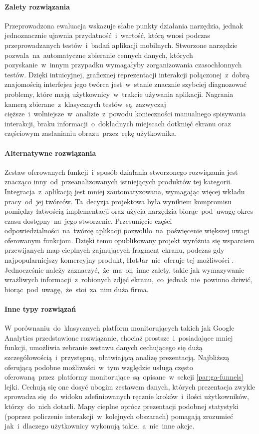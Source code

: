 \paragraph{Zalety rozwiązania}
Przeprowadzona ewaluacja wskazuje słabe punkty działania narzędzia, jednak jednoznacznie ujawnia przydatność~i~wartość, którą wnosi podczas przeprowadzanych testów~i~badań aplikacji mobilnych. Stworzone narzędzie pozwala~na~automatyczne zbieranie cennych danych, których pozyskanie~w~innym przypadku wymagałyby zorganizowania czasochłonnych testów. Dzięki intuicyjnej, graficznej reprezentacji interakcji połączonej~z~dobrą znajomością interfejsu jego twórca jest~w~stanie znacznie szybciej diagnozować problemy, które mają użytkownicy~w~trakcie używania aplikacji. Nagrania kamerą zbierane~z~klasycznych testów~są~zazwyczaj cięższe~i~wolniejsze~w~analizie~z~powodu konieczności manualnego spisywania interakcji, braku informacji~o~dokładnych miejscach dotknięć ekranu oraz częściowym zasłanianiu obrazu~przez~rękę użytkownika. 

\paragraph{Alternatywne rozwiązania}
Zestaw oferowanych funkcji~i~sposób działania stworzonego rozwiązania jest znacząco inny~od~przeanalizowanych istniejących produktów tej kategorii. Integracja~z~aplikacją jest mniej zautomatyzowana, wymagając więcej wkładu pracy~od~jej twórców. Ta~decyzja projektowa była wynikiem kompromisu pomiędzy łatwością implementacji oraz użycia narzędzia biorąc~pod~uwagę okres czasu dostępny~na~jego stworzenie. Przesunięcie części odpowiedzialności~na~twórcę aplikacji pozwoliło~na~poświęcenie większej uwagi oferowanym funkcjom. Dzięki temu opublikowany projekt wyróżnia się wsparciem przewijanych map cieplnych zajmujących fragment ekranu, podczas gdy najpopularniejszy komercyjny produkt, HotJar~nie~oferuje tej możliwości \cite{Hotjar_limitations}. Jednocześnie należy zaznaczyć,~że~ma~on~inne zalety, takie jak wymazywanie wrażliwych informacji~z~robionych zdjęć ekranu,~co~jednak~nie~powinno dziwić, biorąc~pod~uwagę,~że~stoi~za~nim duża firma.

\paragraph{Inne typy rozwiązań}
W porównaniu~do~klasycznych platform monitorujących takich jak Google Analytics przedstawione rozwiązanie, chociaż prostsze~i~posiadające mniej funkcji, umożliwia zebranie zestawu danych cechującego się dużą szczegółowością~i~przystępną, ułatwiającą analizę prezentacją. Najbliższą oferującą podobne możliwości~w~tym względzie usługą często oferowaną~przez~platformy monitorujące~są~opisane~w~sekcji \ref{par:ga-funnels} lejki. Cechują się one dosyć  ubogim zestawem danych, których prezentacja zwykle sprowadza się~do~widoku zdefiniowanych ręcznie kroków~i~ilości użytkowników, którzy~do~nich dotarli. Mapy cieplne oprócz prezentacji podobnej statystyki (poprzez policzenie interakcji~w~kolejnych obszarach) pomagają zrozumieć jak~i~dlaczego użytkownicy wykonują takie,~a~nie~inne akcje.
